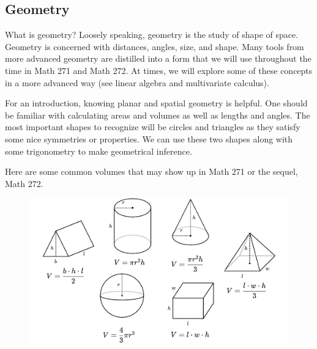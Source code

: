     \subsection{Geometry}

    What is geometry? Loosely speaking, geometry is the study of shape of space.  Geometry is concerned with distances, angles, size, and shape.  Many tools from more advanced geometry are distilled into a form that we will use throughout the time in Math 271 and Math 272.  At times, we will explore some of these concepts in a more advanced way (see linear algebra and multivariate calculus).

    For an introduction, knowing planar and spatial geometry is helpful.  One should be familiar with calculating areas and volumes as well as lengths and angles. The most important shapes to recognize will be circles and triangles as they satisfy some nice symmetries or properties.  We can use these two shapes along with some trigonometry to make geometrical inference.

    Here are some common volumes that may show up in Math 271 or the sequel, Math 272.

    \begin{figure}[H]
        \centering
        \includegraphics[width=.8\textwidth]{Figures_Part_1/volumes.png}
        \label{fig:volumes}
    \end{figure}




